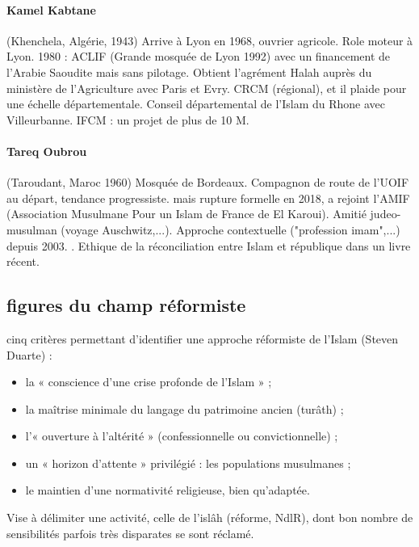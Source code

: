 \paragraph{Kamel Kabtane}(Khenchela, Algérie, 1943) Arrive à Lyon en 1968, ouvrier agricole. Role moteur à Lyon. 1980 : ACLIF (Grande mosquée de Lyon 1992) avec un financement de l'Arabie Saoudite mais sans pilotage. Obtient l'agrément Halah auprès du ministère de l'Agriculture avec Paris et Evry. CRCM (régional), et il plaide pour une échelle départementale. Conseil départemental de l'Islam du Rhone avec Villeurbanne. IFCM : un projet de plus de 10 M\EUR{}. 
\paragraph{Tareq Oubrou} (Taroudant, Maroc 1960) Mosquée de Bordeaux. Compagnon de route de l'UOIF au départ, tendance progressiste. mais rupture formelle en 2018, a rejoint l'AMIF (Association Musulmane Pour un Islam de France de El Karoui).  Amitié judeo-musulman (voyage Auschwitz,...). Approche contextuelle ("profession imam",...) depuis 2003. . Ethique de la réconciliation entre Islam et république dans un livre récent.  

\subsection{figures du champ réformiste}


\begin{Def}
cinq critères permettant d’identifier une approche réformiste de l’Islam (Steven Duarte) :
\begin{itemize}
    \item la « conscience d’une crise profonde de l’Islam » ;
\item la maîtrise minimale du langage du patrimoine ancien (turâth) ;
\item l’« ouverture à l’altérité » (confessionnelle ou convictionnelle) ;
\item un « horizon d’attente » privilégié : les populations musulmanes ;
\item le maintien d’une normativité religieuse, bien qu’adaptée.
\end{itemize}
Vise à délimiter une activité, celle de l’islâh (réforme, NdlR), dont bon nombre de sensibilités parfois très disparates se sont réclamé. 
\end{Def}

